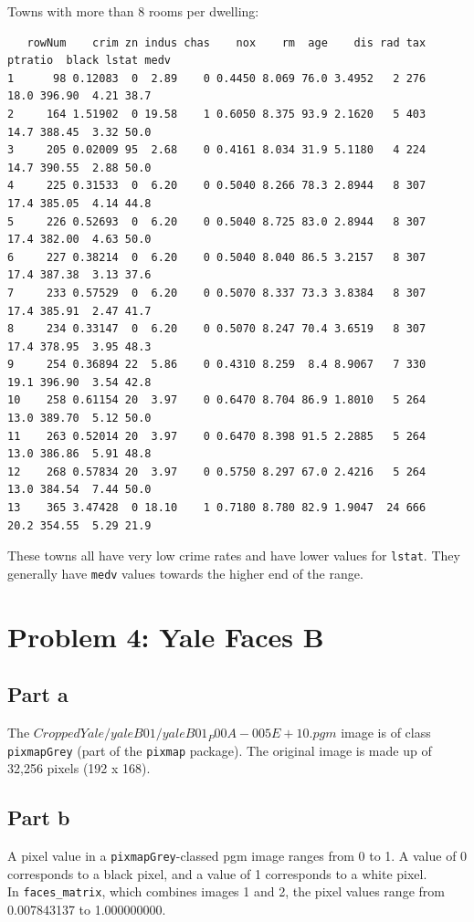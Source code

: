 \documentclass[11pt]{article}
\begin{document}
Towns with more than 8 rooms per dwelling:
\begin{verbatim}
   rowNum    crim zn indus chas    nox    rm  age    dis rad tax ptratio  black lstat medv
1      98 0.12083  0  2.89    0 0.4450 8.069 76.0 3.4952   2 276    18.0 396.90  4.21 38.7
2     164 1.51902  0 19.58    1 0.6050 8.375 93.9 2.1620   5 403    14.7 388.45  3.32 50.0
3     205 0.02009 95  2.68    0 0.4161 8.034 31.9 5.1180   4 224    14.7 390.55  2.88 50.0
4     225 0.31533  0  6.20    0 0.5040 8.266 78.3 2.8944   8 307    17.4 385.05  4.14 44.8
5     226 0.52693  0  6.20    0 0.5040 8.725 83.0 2.8944   8 307    17.4 382.00  4.63 50.0
6     227 0.38214  0  6.20    0 0.5040 8.040 86.5 3.2157   8 307    17.4 387.38  3.13 37.6
7     233 0.57529  0  6.20    0 0.5070 8.337 73.3 3.8384   8 307    17.4 385.91  2.47 41.7
8     234 0.33147  0  6.20    0 0.5070 8.247 70.4 3.6519   8 307    17.4 378.95  3.95 48.3
9     254 0.36894 22  5.86    0 0.4310 8.259  8.4 8.9067   7 330    19.1 396.90  3.54 42.8
10    258 0.61154 20  3.97    0 0.6470 8.704 86.9 1.8010   5 264    13.0 389.70  5.12 50.0
11    263 0.52014 20  3.97    0 0.6470 8.398 91.5 2.2885   5 264    13.0 386.86  5.91 48.8
12    268 0.57834 20  3.97    0 0.5750 8.297 67.0 2.4216   5 264    13.0 384.54  7.44 50.0
13    365 3.47428  0 18.10    1 0.7180 8.780 82.9 1.9047  24 666    20.2 354.55  5.29 21.9
\end{verbatim}

These towns all have very low crime rates and have lower values for \texttt{lstat}. They generally have \texttt{medv} values towards the higher end of the range.


\section*{Problem 4: Yale Faces B}

\subsection*{Part a}

The $CroppedYale/yaleB01/yaleB01_P00A-005E+10.pgm$ image is of class \texttt{pixmapGrey} (part of the \texttt{pixmap} package). The original image is made up of 32,256 pixels (192 x 168).



\subsection*{Part b}

A pixel value in a \texttt{pixmapGrey}-classed pgm image ranges from 0 to 1. A value of 0 corresponds to a black pixel, and a value of 1 corresponds to a white pixel.\\

In \texttt{faces\_matrix}, which combines images 1 and 2, the pixel values range from 0.007843137 to 1.000000000.
\end{document}
